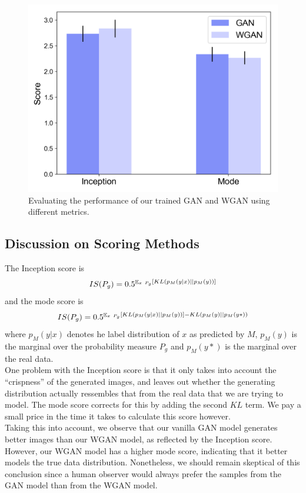 \documentclass[table]{article}
\DeclareMathOperator{\ex}{\mathbb{E}}
\begin{document}
\begin{figure}[ht]
  \centering
  \includegraphics[scale=0.45]{imgs/score}
  \caption{Evaluating the performance of our trained GAN and WGAN using different metrics.}
\end{figure}

\subsection{Discussion on Scoring Methods}

The Inception score is
$$ IS(P_g) = \e^{\ex_{x~P_g} [KL(p_M(y|x)||p_M(y))]} $$
and the mode score is
$$ IS(P_g) = \e^{\ex_{x~P_g} [KL(p_M(y|x)||p_M(y))] - KL(p_M(y) || p_M(y*))} $$
where $p_M(y|x)$ denotes he label distribution of $x$ as predicted by $M$, $p_M(y)$ is the marginal over the probability measure $P_g$ and $p_M(y*)$ is the marginal over the real data.
\\
One problem with the Inception score is that it only takes into account the ``crispness'' of the generated images, and leaves out whether the generating distribution actually ressembles that from the real data that we are trying to model. The mode score corrects for this by adding the second $KL$ term. We pay a small price in the time it takes to calculate this score however.
\\
Taking this into account, we observe that our vanilla GAN model generates better images than our WGAN model, as reflected by the Inception score. However, our WGAN model has a higher mode score, indicating that it better models the true data distribution. Nonetheless, we should remain skeptical of this conclusion since a human observer would always prefer the samples from the GAN model than from the WGAN model.
\end{document}
